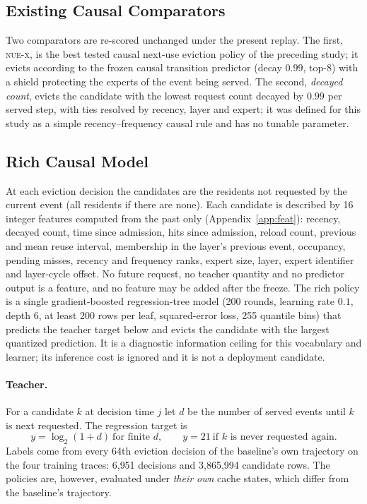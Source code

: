 \documentclass[11pt]{article}
\theoremstyle{plain}
\theoremstyle{definition}
\newcommand{\nuex}{\textsc{nue-x}}
\begin{document}
\subsection{Existing Causal Comparators}
\label{sec:comparators}
Two comparators are re-scored unchanged under the present replay. The first, \nuex{}, is the best tested causal next-use eviction policy of the preceding study; it evicts according to the frozen causal transition predictor (decay $0.99$, top-8) with a shield protecting the experts of the event being served. The second, \emph{decayed count}, evicts the candidate with the lowest request count decayed by $0.99$ per served step, with ties resolved by recency, layer and expert; it was defined for this study as a simple recency--frequency causal rule and has no tunable parameter.

\subsection{Rich Causal Model}
\label{sec:rich}
At each eviction decision the candidates are the residents not requested by the current event (all residents if there are none). Each candidate is described by 16 integer features computed from the past only (Appendix~\ref{app:feat}): recency, decayed count, time since admission, hits since admission, reload count, previous and mean reuse interval, membership in the layer's previous event, occupancy, pending misses, recency and frequency ranks, expert size, layer, expert identifier and layer-cycle offset. No future request, no teacher quantity and no predictor output is a feature, and no feature may be added after the freeze. The rich policy is a single gradient-boosted regression-tree model (200 rounds, learning rate $0.1$, depth 6, at least 200 rows per leaf, squared-error loss, 255 quantile bins) that predicts the teacher target below and evicts the candidate with the largest quantized prediction. It is a diagnostic information ceiling for this vocabulary and learner; its inference cost is ignored and it is not a deployment candidate.

\paragraph{Teacher.} For a candidate $k$ at decision time $j$ let $d$ be the number of served events until $k$ is next requested. The regression target is
\begin{equation}
y = \log_2(1+d)\ \text{for finite } d,\qquad y = 21\ \text{if } k \text{ is never requested again.}
\label{eq:target}
\end{equation}
Labels come from every 64th eviction decision of the baseline's own trajectory on the four training traces: 6{,}951 decisions and 3{,}865{,}994 candidate rows. The policies are, however, evaluated under \emph{their own} cache states, which differ from the baseline's trajectory.
\end{document}
